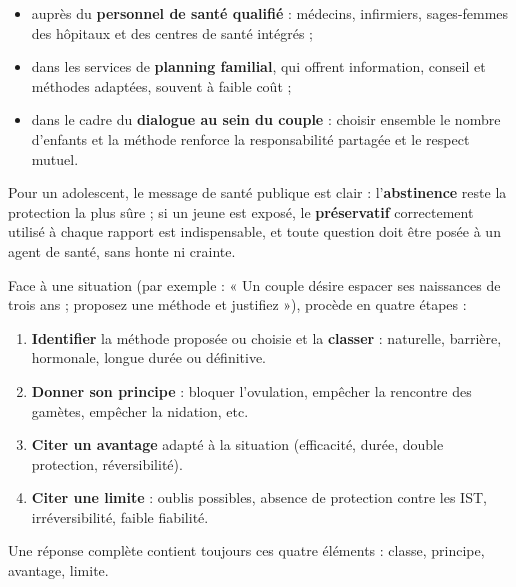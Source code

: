 \documentclass[11pt]{article}
\begin{document}
\begin{itemize}
\item auprès du \textbf{personnel de santé qualifié} : médecins, infirmiers, sages-femmes des hôpitaux et des centres de santé intégrés ;
\item dans les services de \textbf{planning familial}, qui offrent information, conseil et méthodes adaptées, souvent à faible coût ;
\item dans le cadre du \textbf{dialogue au sein du couple} : choisir ensemble le nombre d'enfants et la méthode renforce la responsabilité partagée et le respect mutuel.
\end{itemize}

Pour un adolescent, le message de santé publique est clair : l'\textbf{abstinence} reste la protection la plus sûre ; si un jeune est exposé, le \textbf{préservatif} correctement utilisé à chaque rapport est indispensable, et toute question doit être posée à un agent de santé, sans honte ni crainte.

\begin{methode}
Face à une situation (par exemple : « Un couple désire espacer ses naissances de trois ans ; proposez une méthode et justifiez »), procède en quatre étapes :
\begin{enumerate}
\item \textbf{Identifier} la méthode proposée ou choisie et la \textbf{classer} : naturelle, barrière, hormonale, longue durée ou définitive.
\item \textbf{Donner son principe} : bloquer l'ovulation, empêcher la rencontre des gamètes, empêcher la nidation, etc.
\item \textbf{Citer un avantage} adapté à la situation (efficacité, durée, double protection, réversibilité).
\item \textbf{Citer une limite} : oublis possibles, absence de protection contre les IST, irréversibilité, faible fiabilité.
\end{enumerate}
Une réponse complète contient toujours ces quatre éléments : classe, principe, avantage, limite.
\end{methode}
\end{document}
